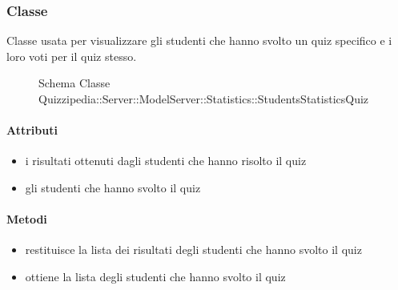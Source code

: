 \subsubsection{Classe }
Classe usata per visualizzare gli studenti che hanno svolto un quiz specifico e i loro voti per il quiz stesso.
\begin{figure}[H]
\centering
\noindent{}
\caption[Schema Classe StudentsStatisticsQuiz]{Schema Classe Quizzipedia::Server::ModelServer::Statistics::StudentsStatisticsQuiz}
\end{figure}
\paragraph{Attributi}
\begin{itemize}
\item {}
\newline
i risultati ottenuti dagli studenti che hanno risolto il quiz
\item {}
\newline
gli studenti che hanno svolto il quiz
\end{itemize}
\paragraph{Metodi}
\begin{itemize}
\item {}
\newline
restituisce la lista dei risultati degli studenti che hanno svolto il quiz
\newline
\item {}
\newline
ottiene la lista degli studenti che hanno svolto il quiz
\newline
\end{itemize}
